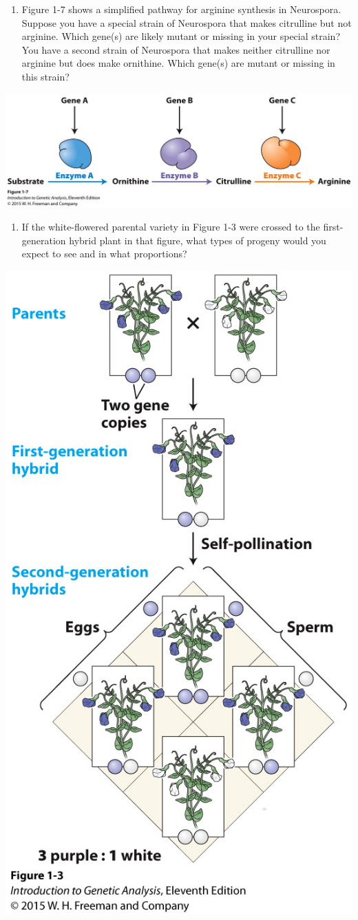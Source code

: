 \documentclass[11pt,]{article}
\providecommand{\tightlist}{%
  \setlength{\itemsep}{0pt}\setlength{\parskip}{0pt}}
\begin{document}
\begin{blackbox}

\begin{enumerate}
\def\labelenumi{\arabic{enumi}.}
\setcounter{enumi}{3}
\tightlist
\item
  Figure 1-7 shows a simplified pathway for arginine synthesis in
  Neurospora. Suppose you have a special strain of Neurospora that makes
  citrulline but not arginine. Which gene(s) are likely mutant or
  missing in your special strain? You have a second strain of Neurospora
  that makes neither citrulline nor arginine but does make ornithine.
  Which gene(s) are mutant or missing in this strain?\\
\end{enumerate}

\begin{center}\includegraphics[width=0.45\linewidth,]{input/figure_01_07} \end{center}

\vspace{17cm}

\end{blackbox}

\begin{blackbox}

\begin{enumerate}
\def\labelenumi{\arabic{enumi}.}
\tightlist
\item
  If the white-flowered parental variety in Figure 1-3 were crossed to
  the first-generation hybrid plant in that figure, what types of
  progeny would you expect to see and in what proportions?
\end{enumerate}

\begin{center}\includegraphics[width=0.35\linewidth,]{input/figure_01_03} \end{center}

\vspace{9cm}

\end{blackbox}
\end{document}
